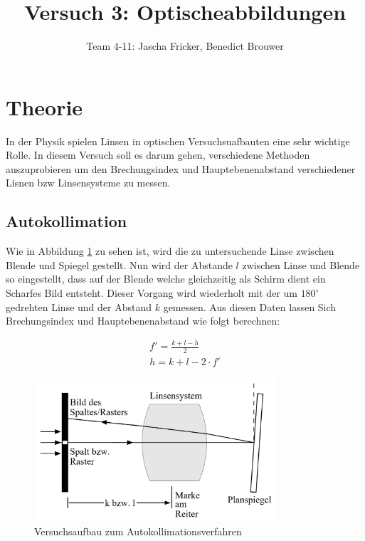\documentclass[11pt, a4paper]{article}
\title{Versuch 3: Optischeabbildungen}
\author{Team 4-11: Jascha Fricker, Benedict Brouwer}
\begin{document}
    \maketitle

    \tableofcontents

    \newpage

    \section{Theorie}
    \FloatBarrier
    In der Physik spielen Linsen in optischen Versuchsuafbauten eine sehr wichtige Rolle. In diesem Versuch soll es darum gehen, verschiedene 
    Methoden auszuprobieren um den Brechungsindex und Hauptebenenabstand verschiedener Lisnen bzw Linsensysteme zu messen.
    \subsection{Autokollimation}
    Wie in Abbildung \ref{fig:autoKollAbb} zu sehen ist, wird die zu untersuchende Linse zwischen Blende und Spiegel gestellt. Nun wird der Abstande $l$ zwischen 
    Linse und Blende so eingestellt, dass auf der Blende welche gleichzeitig als Schirm dient ein Scharfes Bild entsteht. Dieser Vorgang wird wiederholt mit der um $180^\circ$ gedrehten Linse und der Abstand $k$ gemessen.
    Aus diesen Daten lassen Sich Brechungsindex und Hauptebenenabstand wie folgt berechnen:

    \begin{align}
    
    f' = \frac{k+l-h}{2} \label{eq:autokollBrech}\\
    h = k + l - 2 \cdot f' \label{eq:autokollHaupt}
        
    \end{align}

    \begin{figure}
        \centering
        \includegraphics[width=0.8\textwidth]{Autokollimation_abb.png}
        \caption{Versuchsaufbau zum Autokollimationsverfahren}   %
        \label{fig:autoKollAbb}
    \end{figure}
\end{document}
